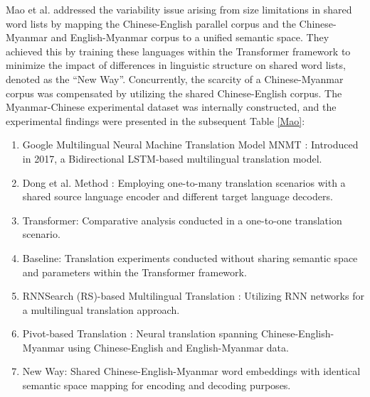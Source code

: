 \documentclass[acmsmall]{acmart}
\begin{document}
\color{red}
Mao et al. \cite{4-2-19} addressed the variability issue arising from size limitations in shared word lists by mapping the Chinese-English parallel corpus and the Chinese-Myanmar and English-Myanmar corpus to a unified semantic space. They achieved this by training these languages within the Transformer framework to minimize the impact of differences in linguistic structure on shared word lists, denoted as the ``New Way''. Concurrently, the scarcity of a Chinese-Myanmar corpus was compensated by utilizing the shared Chinese-English corpus. The Myanmar-Chinese experimental dataset was internally constructed, and the experimental findings were presented in the subsequent Table \ref{Mao}:
\begin{enumerate}[label=\arabic*.]
    \item Google Multilingual Neural Machine Translation Model MNMT \cite{johnson2017google}: Introduced in 2017, a Bidirectional LSTM-based multilingual translation model.
    
    \item Dong et al. Method \cite{dong2015multi}: Employing one-to-many translation scenarios with a shared source language encoder and different target language decoders.
    
    \item Transformer: Comparative analysis conducted in a one-to-one translation scenario.
    
    \item Baseline: Translation experiments conducted without sharing semantic space and parameters within the Transformer framework.
    
    \item RNNSearch (RS)-based Multilingual Translation \cite{bahdanau2014neural}: Utilizing RNN networks for a multilingual translation approach.
    
    \item Pivot-based Translation \cite{n4-59}: Neural translation spanning Chinese-English-Myanmar using Chinese-English and English-Myanmar data.
    
    \item New Way: Shared Chinese-English-Myanmar word embeddings with identical semantic space mapping for encoding and decoding purposes.
\end{enumerate}
\color{black}
\end{document}
